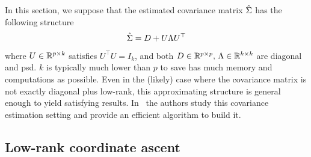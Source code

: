 In this section, we suppose that the estimated covariance matrix $\hat{\Sigma}$ has the following structure
\begin{equation}\label{eq:low_rank_structure}
    \hat{\Sigma} = D + U \Lambda U^\top
\end{equation}
where $U \in \mathbb{R}^{p \times k}$ satisfies $U^\top U = I_k$,
and both $D \in \mathbb{R}^{p \times p},\, \Lambda \in \mathbb{R}^{k \times k}$
are diagonal and psd.
$k$ is typically much lower than $p$ to save has much memory and computations as possible.
Even in the (likely) case where the covariance matrix is not exactly diagonal plus low-rank,
this approximating structure is general enough to yield satisfying results.
In~\cite{low_rank_cov_estimation} the authors study this covariance estimation setting and provide an
efficient algorithm to build it.

\subsection{Low-rank coordinate ascent}\label{subsec:low_rank_sdp}


